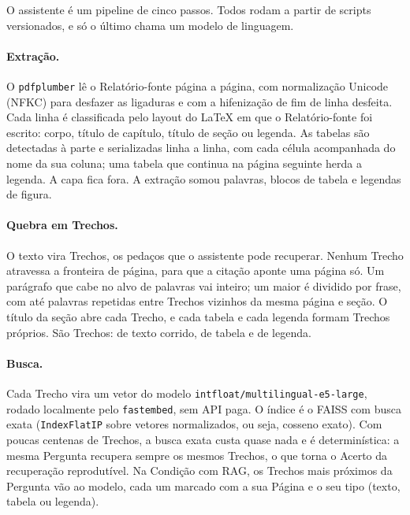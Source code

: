 \documentclass[11pt,a4paper]{article}
\begin{document}
O assistente é um pipeline de cinco passos. Todos rodam a partir de scripts
versionados, e só o último chama um modelo de linguagem.

\paragraph{Extração.} O \texttt{pdfplumber} lê o Relatório-fonte página a
página, com normalização Unicode (NFKC) para desfazer as ligaduras e com a
hifenização de fim de linha desfeita. Cada linha é classificada pelo layout
do LaTeX em que o Relatório-fonte foi escrito: corpo, título de capítulo,
título de seção ou legenda. As tabelas são detectadas à parte e
serializadas linha a linha, com cada célula acompanhada do nome da sua
coluna; uma tabela que continua na página seguinte herda a legenda. A
capa fica fora. A extração somou \NumCorpusPalavras{} palavras,
\NumCorpusTabelas{} blocos de tabela e \NumCorpusLegendas{} legendas de
figura.

\paragraph{Quebra em Trechos.} O texto vira Trechos, os pedaços que o
assistente pode recuperar. Nenhum Trecho atravessa a fronteira de página,
para que a citação aponte uma página só. Um parágrafo que cabe no alvo de
\NumQuebraAlvo{} palavras vai inteiro; um maior é dividido por frase, com
até \NumQuebraSobreposicao{} palavras repetidas entre Trechos vizinhos da
mesma página e seção. O título da seção abre cada Trecho, e cada tabela e
cada legenda formam Trechos próprios. São \NumCorpusTrechos{} Trechos:
\NumCorpusTrechosTexto{} de texto corrido, \NumCorpusTrechosTabela{} de
tabela e \NumCorpusTrechosLegenda{} de legenda.

\paragraph{Busca.} Cada Trecho vira um vetor do modelo
\texttt{intfloat/multilingual-e5-large}, rodado localmente pelo
\texttt{fastembed}, sem API paga. O índice é o FAISS com busca exata
(\texttt{IndexFlatIP} sobre vetores normalizados, ou seja, cosseno exato). Com
poucas centenas de Trechos, a busca exata custa quase nada e é
determinística: a mesma Pergunta recupera sempre os mesmos Trechos, o que
torna o Acerto da recuperação reprodutível. Na Condição com RAG, os
\NumParametrosK{} Trechos mais próximos da Pergunta vão ao modelo, cada um
marcado com a sua Página e o seu tipo (texto, tabela ou legenda).
\end{document}
